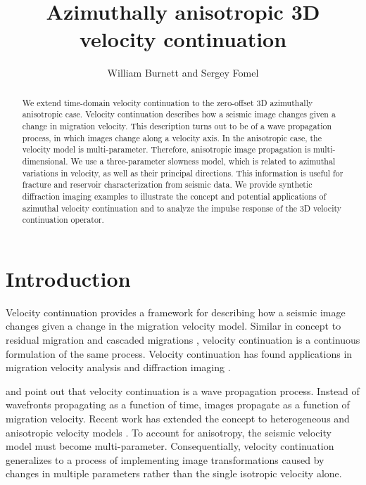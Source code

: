 
\title{Azimuthally anisotropic 3D velocity continuation}


\renewcommand{\thefootnote}{\fnsymbol{footnote}} 

\author{William Burnett and Sergey Fomel}

\maketitle

\begin{abstract}
We extend time-domain velocity continuation to the zero-offset 3D azimuthally anisotropic case.  
Velocity continuation describes how a seismic image changes given a change in migration velocity.  
This description turns out to be of a wave propagation process, in which images change along a velocity axis.  
In the anisotropic case, the velocity model is multi-parameter. 
Therefore, anisotropic image propagation is multi-dimensional.  
We use a three-parameter slowness model, which is related to azimuthal variations in velocity, as well as their principal directions.  
This information is useful for fracture and reservoir characterization from seismic data.  
We provide synthetic diffraction imaging examples to illustrate the concept and potential applications of azimuthal velocity continuation and to analyze the impulse response of the 3D velocity continuation operator.
\end{abstract}

\section{Introduction}

Velocity continuation \cite[]{fomel94, GEO68-05-16501661} provides a framework for describing how a seismic image changes given a change in the migration velocity model.  
Similar in concept to residual migration \cite[]{GEO50-01-01100126} and cascaded migrations \cite[]{GEO52-05-06180643}, velocity continuation is a continuous formulation of the same process.  
Velocity continuation has found applications in migration velocity analysis \cite[]{GEO68-05-16621672, schleicher_etal08a} and diffraction imaging \cite[]{novais_etal06, fomel_landa_taner07}.


\cite{fomel94} and \cite{hubral_etal96} point out that velocity continuation is a wave propagation process.  
Instead of wavefronts propagating as a function of time, images propagate as a function of migration velocity.  
Recent work has extended the concept to heterogeneous and anisotropic velocity models \cite[]{Alkhalifah.sep.94.tariq3, GEO67-01-01260134, iversen06, schleicher_alexio07, schleicher_etal08b, duchkov_dehoop09}.  
To account for anisotropy, the seismic velocity model must become multi-parameter.  
Consequentially, velocity continuation generalizes to a process of implementing image transformations caused by changes in multiple parameters rather than the single isotropic velocity alone.

